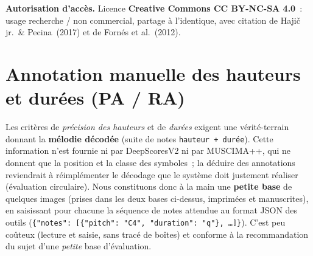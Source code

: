 \documentclass[11pt,a4paper]{article}
\begin{document}
\textbf{Autorisation d'accès.} Licence \textbf{Creative Commons CC BY-NC-SA 4.0}~: usage recherche / non
commercial, partage à l'identique, avec citation de Haji\v{c} jr.\ \& Pecina~(2017) et de Fornés et
al.~(2012).

\section{Annotation manuelle des hauteurs et durées (PA / RA)}
Les critères de \emph{précision des hauteurs} et de \emph{durées} exigent une vérité-terrain donnant la
\textbf{mélodie décodée} (suite de notes \texttt{hauteur~+~durée}). Cette information n'est fournie ni par
DeepScoresV2 ni par MUSCIMA++, qui ne donnent que la position et la classe des symboles~; la déduire des
annotations reviendrait à réimplémenter le décodage que le système doit justement réaliser (évaluation
circulaire). Nous constituons donc à la main une \textbf{petite base} de quelques images (prises dans les deux
bases ci-dessus, imprimées et manuscrites), en saisissant pour chacune la séquence de notes attendue au format
JSON des outils (\texttt{\{"notes": [\{"pitch": "C4", "duration": "q"\}, \dots]\}}). C'est peu coûteux (lecture
et saisie, sans tracé de boîtes) et conforme à la recommandation du sujet d'une \emph{petite} base
d'évaluation.

\printbibliography[heading=bibnumbered,title={Références}]
\end{document}
